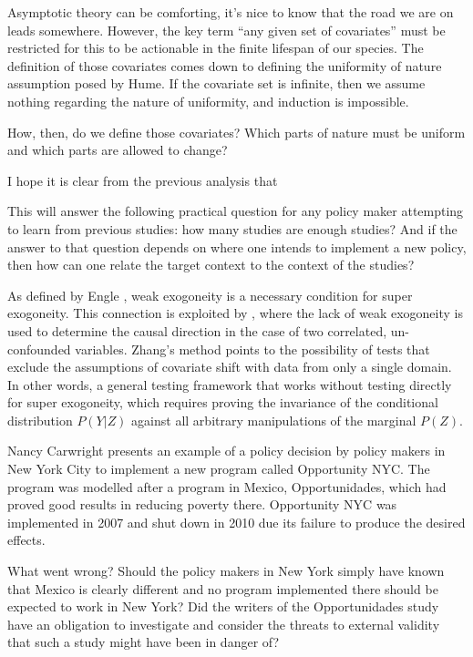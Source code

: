 \documentclass[a4paper,12pt]{article}
\begin{document}
Asymptotic theory can be comforting, it's nice to know that the road we are on leads somewhere. However, the key term ``any given set of covariates'' must be restricted for this to be actionable in the finite lifespan of our species. The definition of those covariates comes down to defining the uniformity of nature assumption posed by Hume. If the covariate set is infinite, then we assume nothing regarding the nature of uniformity, and induction is impossible.

How, then, do we define those covariates? Which parts of nature must be uniform and which parts are allowed to change? 

I hope it is clear from the previous analysis that 

This will answer the following practical question for any policy maker attempting to learn from previous studies: how many studies are enough studies? And if the answer to that question depends on where one intends to implement a new policy, then how can one relate the target context to the context of the studies? 



As defined by Engle \parencite*{Engle1983}, weak exogoneity is a necessary condition for super exogoneity. This connection is exploited by \cite{Zhang2015}, where the lack of weak exogoneity is used to determine the causal direction in the case of two correlated, un-confounded variables. Zhang's method points to the possibility of tests that exclude the assumptions of covariate shift with data from only a single domain. In other words, a general testing framework that works without testing directly for super exogoneity, which requires proving the invariance of the conditional distribution $P(Y|Z)$ against all arbitrary manipulations of the marginal $P(Z)$. 



Nancy Carwright \parencite*{Cartwright2016} presents an example of a policy decision by policy makers in New York City to implement a new program called Opportunity NYC. The program was modelled after a program in Mexico, Opportunidades, which had proved good results in reducing poverty there. Opportunity NYC was implemented in 2007 and shut down in 2010 due its failure to produce the desired effects. 

What went wrong? Should the policy makers in New York simply have known that Mexico is clearly different and no program implemented there should be expected to work in New York? Did the writers of the Opportunidades study have an obligation to investigate and consider the threats to external validity that such a study might have been in danger of? 
\end{document}
